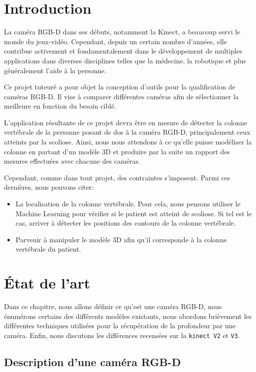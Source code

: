 \documentclass[a4paper, 12pt]{book}
\begin{document}
\chapter*{Introduction}
La caméra RGB-D dans ses débuts, notamment la Kinect, a beaucoup
servi le monde du jeux-vidéo. Cependant, depuis un certain nombre d'années, elle contribue activement et fondamentalement dans le développement
de multiples applications dans diverses disciplines telles que la médecine, la
robotique et plus généralement l'aide à la personne.
\par Ce projet tuteuré a pour objet la conception d'outils pour la qualification de caméras RGB-D. Il vise à comparer différentes caméras afin de sélectionner la meilleure en
fonction du besoin ciblé.
\par L'application résultante de ce projet devra être en mesure de détecter la colonne vertébrale de la personne posant de dos à la caméra RGB-D, principalement ceux atteints par la scoliose. Ainsi, nous nous attendons à ce qu'elle puisse modéliser la colonne en partant d'un modèle 3D et produire par la suite un rapport des mesures effectuées avec chacune des caméras. 
\par Cependant, comme dans tout projet, des contraintes s'imposent. Parmi ces dernières, nous pouvons citer:
\begin{itemize}
	\item La localisation de la colonne vertébrale. Pour cela, nous pensons utiliser le Machine Learning pour vérifier si le patient est atteint de scoliose. Si tel est le cas, arriver à détecter les positions des contours de la colonne vertébrale.
	\item Parvenir à manipuler le modèle 3D afin qu'il corresponde à la colonne vertébrale du patient.
\end{itemize}

\chapter{État de l'art}

Dans ce chapitre, nous allons définir ce qu'est une caméra RGB-D, nous énumérons certains des différents modèles existants, nous abordons brièvement les différentes techniques utilisées pour la récupération de la profondeur par une caméra. Enfin, nous discutons les différences recensées sur la \texttt{kinect V2} et \texttt{V3}.

\section{Description d'une caméra RGB-D}
\end{document}

